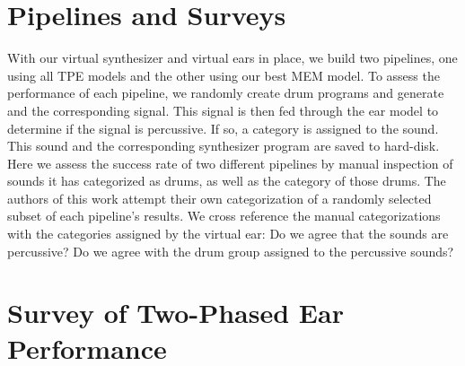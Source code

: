 \documentclass[runningheads,a4paper]{llncs}
\begin{document}
\section{Pipelines and Surveys}
\label{gens}
\label{surveys}
With our virtual synthesizer and virtual ears in place, we build two pipelines, one using all TPE models and the other using our best MEM model. To assess the performance of each pipeline, we randomly create drum programs and generate and the corresponding signal. This signal is then fed through the ear model to determine if the signal is percussive. If so, a category is assigned to the sound. This sound and the corresponding synthesizer program are saved to hard-disk. Here we assess the success rate of two different pipelines by manual inspection of sounds it has categorized as drums, as well as the category of those drums. The authors of this work attempt their own categorization of a randomly selected subset of each pipeline's results. We cross reference the manual categorizations with the categories assigned by the virtual ear: Do we agree that the sounds are percussive? Do we agree with the drum group assigned to the percussive sounds?
 
 \section{Survey of Two-Phased Ear Performance}
   
\end{document}
